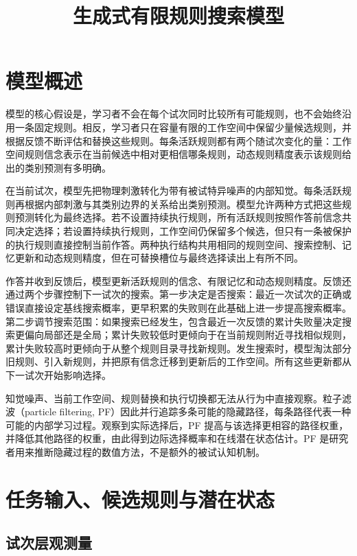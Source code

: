 \documentclass[12pt]{article}
\title{生成式有限规则搜索模型}
\author{}
\date{}
\begin{document}
\maketitle

\section{模型概述}

模型的核心假设是，学习者不会在每个试次同时比较所有可能规则，也不会始终沿用一条固定规则。相反，学习者只在容量有限的工作空间中保留少量候选规则，并根据反馈不断评估和替换这些规则。每条活跃规则都有两个随试次变化的量：工作空间规则信念表示在当前候选中相对更相信哪条规则，动态规则精度表示该规则给出的类别预测有多明确。

在当前试次，模型先把物理刺激转化为带有被试特异噪声的内部知觉。每条活跃规则再根据内部刺激与其类别边界的关系给出类别预测。模型允许两种方式把这些规则预测转化为最终选择。若不设置持续执行规则，所有活跃规则按照作答前信念共同决定选择；若设置持续执行规则，工作空间仍保留多个候选，但只有一条被保护的执行规则直接控制当前作答。两种执行结构共用相同的规则空间、搜索控制、记忆更新和动态规则精度，但在可替换槽位与最终选择读出上有所不同。

作答并收到反馈后，模型更新活跃规则的信念、有限记忆和动态规则精度。反馈还通过两个步骤控制下一试次的搜索。第一步决定是否搜索：最近一次试次的正确或错误直接设定基线搜索概率，更早积累的失败则在此基础上进一步提高搜索概率。第二步调节搜索范围：如果搜索已经发生，包含最近一次反馈的累计失败量决定搜索更偏向局部还是全局；累计失败较低时更倾向于在当前规则附近寻找相似规则，累计失败较高时更倾向于从整个规则目录寻找新规则。发生搜索时，模型淘汰部分旧规则、引入新规则，并把原有信念迁移到更新后的工作空间。所有这些更新都从下一试次开始影响选择。

知觉噪声、当前工作空间、规则替换和执行切换都无法从行为中直接观察。粒子滤波（particle filtering, PF）因此并行追踪多条可能的隐藏路径，每条路径代表一种可能的内部学习过程。观察到实际选择后，PF 提高与该选择更相容的路径权重，并降低其他路径的权重，由此得到边际选择概率和在线潜在状态估计。PF 是研究者用来推断隐藏过程的数值方法，不是额外的被试认知机制。

\section{任务输入、候选规则与潜在状态}

\subsection{试次层观测量}
\end{document}
